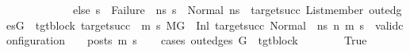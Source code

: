 \begin{isabellebody}
\ \ \ \ \ \ \ \ \ \ \ \ else\ s{}{\isacharprime}{\kern0pt}\ {\isasymnoteq}\ Failure{\isacharparenright}{\kern0pt}{\isacharparenright}{\kern0pt}\ {\isasymand}\ {\isacharparenleft}{\kern0pt}{\isasymforall}ns{}{\isacharprime}{\kern0pt}{\isachardot}{\kern0pt}\ s{}{\isacharprime}{\kern0pt}\ {\isacharequal}{\kern0pt}\ Normal\ ns{}{\isacharprime}{\kern0pt}\ {\isasymlongrightarrow}\ {\isacharparenleft}{\kern0pt}{\isasymforall}target{\isacharunderscore}{\kern0pt}succ{\isachardot}{\kern0pt}\ List{\isachardot}{\kern0pt}member\ {\isacharparenleft}{\kern0pt}out{\isacharunderscore}{\kern0pt}edges{\isacharparenleft}{\kern0pt}G{\isacharprime}{\kern0pt}{\isacharparenright}{\kern0pt}\ {\isacharbang}{\kern0pt}\ tgt{\isacharunderscore}{\kern0pt}block{\isacharparenright}{\kern0pt}\ target{\isacharunderscore}{\kern0pt}succ\ {\isasymlongrightarrow}\ {\isacharparenleft}{\kern0pt}{\isasymforall}m{}{\isacharprime}{\kern0pt}\ s{}{\isacharprime}{\kern0pt}{\isachardot}{\kern0pt}\ {\isacharparenleft}{\kern0pt}M{\isacharcomma}{\kern0pt}{\isasymLambda}{\isacharcomma}{\kern0pt}{\isasymGamma}{\isacharcomma}{\kern0pt}{\isasymOmega}{\isacharcomma}{\kern0pt}G{\isacharprime}{\kern0pt}\ {\isasymturnstile}\ {\isacharparenleft}{\kern0pt}Inl\ target{\isacharunderscore}{\kern0pt}succ{\isacharcomma}{\kern0pt}\ {\isacharparenleft}{\kern0pt}Normal\ \ ns{}{\isacharprime}{\kern0pt}{\isacharparenright}{\kern0pt}{\isacharparenright}{\kern0pt}\ {\isacharminus}{\kern0pt}n{\isasymrightarrow}{\isacharasterisk}{\kern0pt}\ {\isacharparenleft}{\kern0pt}m{}{\isacharprime}{\kern0pt}{\isacharcomma}{\kern0pt}\ s{}{\isacharprime}{\kern0pt}{\isacharparenright}{\kern0pt}{\isacharparenright}{\kern0pt}\ {\isasymlongrightarrow}\ valid{\isacharunderscore}{\kern0pt}configuration\ {\isasymLambda}\ {\isasymGamma}\ {\isasymOmega}\ posts\ m{}{\isacharprime}{\kern0pt}\ s{}{\isacharprime}{\kern0pt}{\isacharparenright}{\kern0pt}{\isacharparenright}{\kern0pt}{\isacharparenright}{\kern0pt}{\isachardoublequoteclose}\isanewline
\ \ \isamarkupfalse%
\ {\isacharparenleft}{\kern0pt}cases\ {\isachardoublequoteopen}out{\isacharunderscore}{\kern0pt}edges\ G{\isacharprime}{\kern0pt}\ {\isacharbang}{\kern0pt}\ tgt{\isacharunderscore}{\kern0pt}block\ {\isacharequal}{\kern0pt}\ {\isacharbrackleft}{\kern0pt}{\isacharbrackright}{\kern0pt}{\isachardoublequoteclose}{\isacharparenright}{\kern0pt}\isanewline
\ \ \ \ \isamarkupfalse%
\ True\isanewline
\ \ \ \ \isamarkupfalse%

\end{isabellebody}
